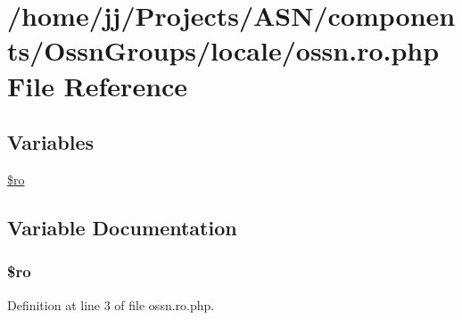 \hypertarget{components_2_ossn_groups_2locale_2ossn_8ro_8php}{}\section{/home/jj/\+Projects/\+A\+S\+N/components/\+Ossn\+Groups/locale/ossn.ro.\+php File Reference}
\label{components_2_ossn_groups_2locale_2ossn_8ro_8php}
\subsection*{Variables}
\begin{DoxyCompactItemize}
\item 
\hyperlink{components_2_ossn_groups_2locale_2ossn_8ro_8php_ad432e1965f7fa8ce0807b244734e70f8}{\$ro}
\end{DoxyCompactItemize}


\subsection{Variable Documentation}
\subsubsection[{\texorpdfstring{\$ro}{$ro}}]{\setlength{\rightskip}{0pt plus 5cm}\$ro}\hypertarget{components_2_ossn_groups_2locale_2ossn_8ro_8php_ad432e1965f7fa8ce0807b244734e70f8}{}\label{components_2_ossn_groups_2locale_2ossn_8ro_8php_ad432e1965f7fa8ce0807b244734e70f8}


Definition at line 3 of file ossn.\+ro.\+php.

